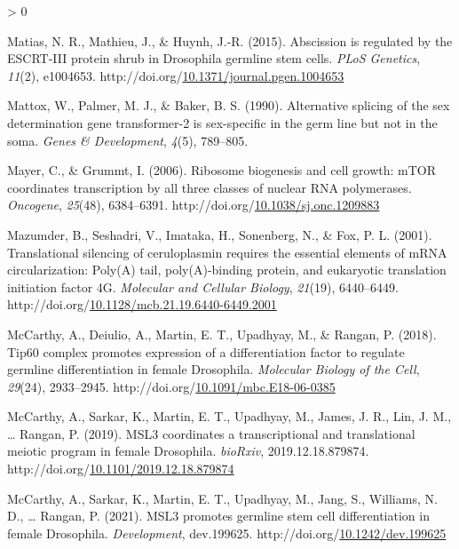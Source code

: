 \documentclass[12pt,oneside]{reedthesis}
\newlength{\cslhangindent}
\newenvironment{CSLReferences}[2] %
 {%
  \setlength{\parindent}{0pt}
  \ifodd #1 \everypar{\setlength{\hangindent}{\cslhangindent}}\ignorespaces\fi
  \ifnum #2 > 0
  \setlength{\parskip}{#2\baselineskip}
  \fi
 }%
 {}
\begin{document}
\begin{CSLReferences}{1}{0}
\leavevmode\hypertarget{ref-Matias2015g}{}%
Matias, N. R., Mathieu, J., \& Huynh, J.-R. (2015). Abscission is regulated by the {ESCRT-III} protein shrub in {Drosophila} germline stem cells. \emph{PLoS Genetics}, \emph{11}(2), e1004653. http://doi.org/\href{https://doi.org/10.1371/journal.pgen.1004653}{10.1371/journal.pgen.1004653}

\leavevmode\hypertarget{ref-Mattox1990}{}%
Mattox, W., Palmer, M. J., \& Baker, B. S. (1990). Alternative splicing of the sex determination gene transformer-2 is sex-specific in the germ line but not in the soma. \emph{Genes \& Development}, \emph{4}(5), 789--805.

\leavevmode\hypertarget{ref-Mayer2006a}{}%
Mayer, C., \& Grummt, I. (2006). Ribosome biogenesis and cell growth: {mTOR} coordinates transcription by all three classes of nuclear {RNA} polymerases. \emph{Oncogene}, \emph{25}(48), 6384--6391. http://doi.org/\href{https://doi.org/10.1038/sj.onc.1209883}{10.1038/sj.onc.1209883}

\leavevmode\hypertarget{ref-Mazumder2001k}{}%
Mazumder, B., Seshadri, V., Imataka, H., Sonenberg, N., \& Fox, P. L. (2001). Translational silencing of ceruloplasmin requires the essential elements of {mRNA} circularization: Poly({A}) tail, poly({A})-binding protein, and eukaryotic translation initiation factor {4G}. \emph{Molecular and Cellular Biology}, \emph{21}(19), 6440--6449. http://doi.org/\href{https://doi.org/10.1128/mcb.21.19.6440-6449.2001}{10.1128/mcb.21.19.6440-6449.2001}

\leavevmode\hypertarget{ref-McCarthy2018h}{}%
McCarthy, A., Deiulio, A., Martin, E. T., Upadhyay, M., \& Rangan, P. (2018). Tip60 complex promotes expression of a differentiation factor to regulate germline differentiation in female {Drosophila}. \emph{Molecular Biology of the Cell}, \emph{29}(24), 2933--2945. http://doi.org/\href{https://doi.org/10.1091/mbc.E18-06-0385}{10.1091/mbc.E18-06-0385}

\leavevmode\hypertarget{ref-mccarthyMSL3CoordinatesTranscriptional2019}{}%
McCarthy, A., Sarkar, K., Martin, E. T., Upadhyay, M., James, J. R., Lin, J. M., \ldots{} Rangan, P. (2019). {MSL3} coordinates a transcriptional and translational meiotic program in female {Drosophila}. \emph{bioRxiv}, 2019.12.18.879874. http://doi.org/\href{https://doi.org/10.1101/2019.12.18.879874}{10.1101/2019.12.18.879874}

\leavevmode\hypertarget{ref-mccarthyMSL3PromotesGermline2021}{}%
McCarthy, A., Sarkar, K., Martin, E. T., Upadhyay, M., Jang, S., Williams, N. D., \ldots{} Rangan, P. (2021). {MSL3} promotes germline stem cell differentiation in female {Drosophila}. \emph{Development}, dev.199625. http://doi.org/\href{https://doi.org/10.1242/dev.199625}{10.1242/dev.199625}


\end{CSLReferences}
\end{document}
